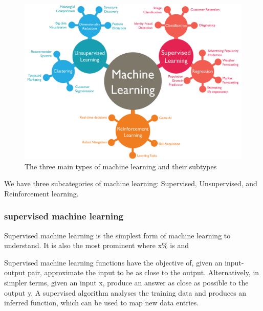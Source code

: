     \begin{figure}[h]
        \centering
        \includegraphics[scale=0.3]{background/figures/ML_types.png}
        \caption{The three main types of machine learning and their subtypes}
    \label{fig:ML_types} 
    \end{figure}

We have three subcategories of machine learning: Supervised, Unsupervised, and Reinforcement learning. 

\subsubsection{supervised machine learning}
Supervised machine learning is the simplest form of machine learning to understand. It is also the most prominent where x\% is and 

Supervised machine learning functions have the objective of, given an input-output pair, approximate the input to be as close to the output.  
Alternatively, in simpler terms, given an input x, produce an answer as close as possible to the output y.
A supervised algorithm analyses the training data and produces an inferred function, which can be used to map new data entries. 

